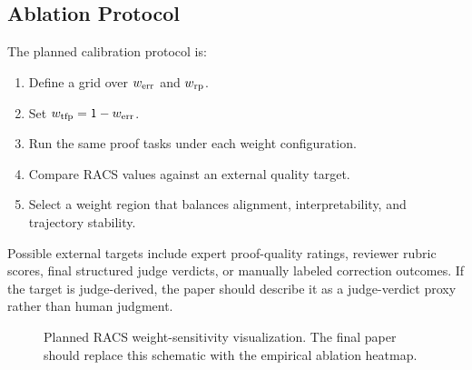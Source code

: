 \documentclass[conference]{IEEEtran}
\begin{document}
\subsection{Ablation Protocol}
The planned calibration protocol is:
\begin{enumerate}
    \item Define a grid over $w_{\rm err}$ and $w_{\rm rp}$.
    \item Set $w_{\rm tfp}=1-w_{\rm err}$.
    \item Run the same proof tasks under each weight configuration.
    \item Compare RACS values against an external quality target.
    \item Select a weight region that balances alignment, interpretability, and trajectory stability.
\end{enumerate}

Possible external targets include expert proof-quality ratings, reviewer rubric scores, final structured judge verdicts, or manually labeled correction outcomes. If the target is judge-derived, the paper should describe it as a judge-verdict proxy rather than human judgment.

\begin{figure}[t]
\centering
{}
\caption{Planned RACS weight-sensitivity visualization. The final paper should replace this schematic with the empirical ablation heatmap.}
\label{fig:ablation_heatmap}
\end{figure}
\end{document}
